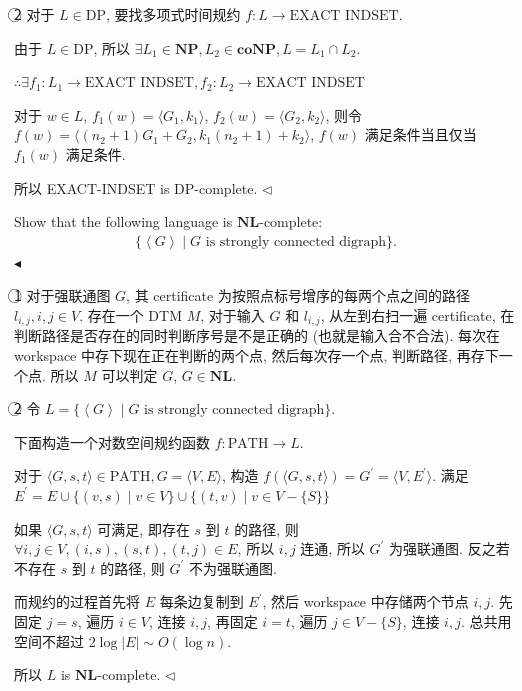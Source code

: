 \documentclass[11pt]{article}
\newcommand{\NP}{\mathbf{NP}}
\newcommand{\coNP}{\mathbf{coNP}}
\newcommand{\NL}{ \mathbf{NL}}
\newcommand{\NLC}{\mathbf{NL}\text{-complete}}
\newenvironment{problem}[2][Problem]{\begin{trivlist}
		\item[\hskip \labelsep {\bfseries #1}\hskip \labelsep {\bfseries #2.}]}{\hfill$\blacktriangleleft$\end{trivlist}}
\newenvironment{answer}[1][Answer]{\begin{trivlist}
		\item[\hskip \labelsep {\bfseries #1.}\hskip \labelsep]}{\hfill$\lhd$\end{trivlist}}
\begin{document}
\begin{answer}
		\textcircled{2} 对于 $L\in\text{DP}$, 要找多项式时间规约 $f:L\rightarrow\text{EXACT INDSET}$.
		
		由于 $L\in\text{DP}$, 所以 $\exists L_1\in\NP,L_2\in\coNP,L=L_1\cap L_2$.
		
		$\therefore\exists f_1:L_1\rightarrow\text{EXACT INDSET},f_2:L_2\rightarrow\text{EXACT INDSET}$
		
		对于 $w\in L$, $f_1(w)=\langle G_1,k_1\rangle$, $f_2(w)=\langle G_2,k_2\rangle$, 则令 $f(w)=\langle (n_2+1)G_1+G_2,k_1(n_2+1)+k_2\rangle$, $f(w)$ 满足条件当且仅当 $f_1(w)$ 满足条件. 
		
		所以 EXACT-INDSET is DP-complete.
	\end{answer}
	\begin{problem}{5.(16 points)}
		Show that the following language is $\NLC$:
		\begin{align*}
			\{ \left\langle G\right\rangle \mid G \text{ is strongly connected digraph}\}.
		\end{align*}
	\end{problem}
	\begin{answer}
		\textcircled{1} 对于强联通图 $G$, 其 certificate 为按照点标号增序的每两个点之间的路径 $l_{i,j},i,j\in V$. 存在一个 DTM $M$, 对于输入 $G$ 和 $l_{i,j}$, 从左到右扫一遍 certificate, 在判断路径是否存在的同时判断序号是不是正确的 (也就是输入合不合法). 每次在 workspace 中存下现在正在判断的两个点, 然后每次存一个点, 判断路径, 再存下一个点. 所以 $M$ 可以判定 $G$, $G\in\NL$.
		
		\textcircled{2} 令 $L=\{ \left\langle G\right\rangle \mid G \text{ is strongly connected digraph}\}.$
		
		下面构造一个对数空间规约函数 $f:\text{PATH}\rightarrow L$.
		
		对于 $\langle G,s,t\rangle\in\text{PATH},G=\langle V,E\rangle$, 构造 $f(\langle G,s,t\rangle)=G^\prime=\langle V,E^\prime\rangle$. 满足 $E^\prime=E\cup\{(v,s)\mid v\in V\}\cup\{(t,v)\mid v\in V-\{S\}\}$
		
		如果 $\langle G,s,t\rangle$ 可满足, 即存在 $s$ 到 $t$ 的路径, 则 $\forall i,j\in V,(i,s),(s,t),(t,j)\in E$, 所以 $i,j$ 连通, 所以 $G^\prime$ 为强联通图. 反之若不存在 $s$ 到 $t$ 的路径, 则 $G^\prime$ 不为强联通图.
		
		而规约的过程首先将 $E$ 每条边复制到 $E^\prime$, 然后 workspace 中存储两个节点 $i,j$. 先固定 $j=s$, 遍历 $i\in V$, 连接 $i,j$, 再固定 $i=t$, 遍历 $j\in V-\{S\}$, 连接 $i,j$. 总共用空间不超过 $2\log |E|\sim O(\log n)$.
		
		所以 $L$ is $\NLC$.
	\end{answer}
\end{document}
